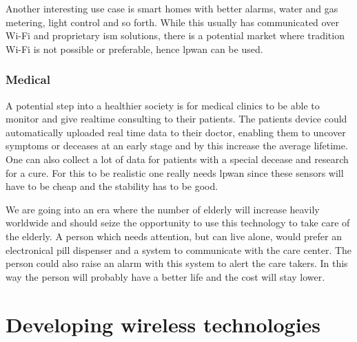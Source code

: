 \documentclass[USenglish]{ifimaster}  %
\begin{document}
Another interesting use case is smart homes with better alarms, water and gas metering, light control and so forth. While this usually has communicated over Wi-Fi and proprietary \acrfull{ism} solutions, there is a potential market where tradition Wi-Fi is not possible or preferable, hence \acrshort{lpwan} can be used.

\subsubsection{Medical}
A potential step into a healthier society is for medical clinics to be able to monitor and give realtime consulting to their patients. The patients device could automatically uploaded real time data to their doctor, enabling them to uncover symptoms or deceases at an early stage and by this increase the average lifetime. One can also collect a lot of data for patients with a special decease and research for a cure. For this to be realistic one really needs \acrshort{lpwan} since these sensors will have to be cheap and the stability has to be good.

We are going into an era where the number of elderly will increase heavily worldwide and should seize the opportunity to use this technology to take care of the elderly. A person which needs attention, but can live alone, would prefer an electronical pill dispenser and a system to communicate with the care center. The person could also raise an alarm with this system to alert the care takers. In this way the person will probably have a better life and the cost will stay lower.

\section{Developing wireless technologies} \label{section:wirelesstech}
\end{document}
